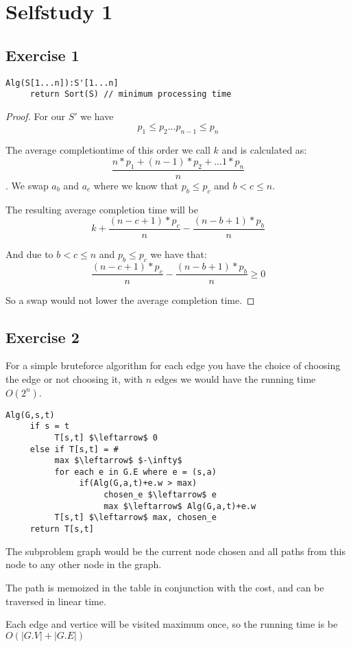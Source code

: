 \documentclass[12pt,a4paper]{report}
\begin{document}
\chapter*{Selfstudy 1}
\section*{Exercise 1}
\begin{lstlisting}
Alg(S[1...n]):S'[1...n]
     return Sort(S) // minimum processing time
\end{lstlisting}

\begin{proof}
For our $S'$ we have 
$$p_1 \leq p_2 ... p_{n-1} \leq p_n$$


The average completiontime of this order we call $k$ and is calculated as:
$$\frac{n*p_1 + (n-1)*p_2 + ... 1 * p_n}{n}$$. We swap $a_b$ and $a_c$ where we know that $p_b \leq p_c$ and $b < c \leq n$.

The resulting average completion time will be 
$$k + \frac{(n-c +1)*p_c}{n} - \frac{(n-b +1)*p_b}{n}$$

And due to $b < c \leq n$ and $p_b \leq p_c$ we have that:
$$\frac{(n-c +1)*p_c}{n} - \frac{(n-b +1)*p_b}{n} \geq 0$$

So a swap would not lower the average completion time.
\end{proof}

\section*{Exercise 2}
For a simple bruteforce algorithm for each edge you have the choice of choosing the edge or not choosing it, with $n$ edges we would have the running time $O(2^n)$.

\begin{lstlisting}
Alg(G,s,t)
     if s = t
          T[s,t] $\leftarrow$ 0
     else if T[s,t] = #
          max $\leftarrow$ $-\infty$
          for each e in G.E where e = (s,a)
               if(Alg(G,a,t)+e.w > max)
                    chosen_e $\leftarrow$ e                    
                    max $\leftarrow$ Alg(G,a,t)+e.w
          T[s,t] $\leftarrow$ max, chosen_e
     return T[s,t]
\end{lstlisting}

The subproblem graph would be the current node chosen and all paths from this node to any other node in the graph.

The path is memoized in the table in conjunction with the cost, and can be traversed in linear time.

Each edge and vertice will be visited maximum once, so the running time is be $O(|G.V| + |G.E|)$
\end{document}
